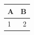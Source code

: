 \documentclass{standalone}
\begin{document}
\begin{tabular}{lr}\toprule A&B\\\midrule 1&2\\\bottomrule\end{tabular}
\end{document}
